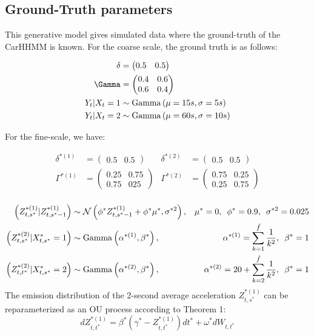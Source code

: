 \subsection{Ground-Truth parameters}

This generative model gives simulated data where the ground-truth of the CarHHMM is known. For the coarse scale, the ground truth is as follows:

\begin{align*}
    \delta &= \begin{pmatrix} 0.5 & 0.5 \end{pmatrix}\\
	\Gamma &= \begin{pmatrix} 0.4 & 0.6 \\ 0.6 & 0.4 \end{pmatrix} \\
	Y_t|X_t = 1 &\sim {\rm{Gamma}}\left(\mu = 15 s, \sigma = 5 s\right) \\
	Y_t|X_t = 2 &\sim {\rm{Gamma}}\left(\mu = 60 s, \sigma = 10 s\right) \\
\end{align*}

For the fine-scale, we have:

\begin{align*}
    \delta^{*(1)} &= \begin{pmatrix} 0.5 & 0.5 \end{pmatrix} & \delta^{*(2)} &= \begin{pmatrix} 0.5 & 0.5 \end{pmatrix} \\
    \Gamma^{*(1)} &= \begin{pmatrix} 0.25 & 0.75 \\ 0.75 & 025 \end{pmatrix} & 	\Gamma^{*(2)} &= \begin{pmatrix} 0.75 & 0.25 \\ 0.25 & 0.75 \end{pmatrix} \\
\end{align*}

\begin{align*}
    \left(Z^{*(1)}_{t,s^*} | Z^{*(1)}_{t,s^*-1} \right) &\sim \mathcal{N} \left(\phi^*Z^{*(1)}_{t,s^*-1} + \phi^*\mu^*, \sigma^{*2} \right), & \mu^* = 0, \enspace \phi^* = 0.9, \enspace \sigma^{*2} = 0.025 \\
    \left(Z^{*(2)}_{t,s^*} | X^*_{t,s^*} = 1\right) &\sim {\rm{Gamma}}\left(\alpha^{*(1)}, \beta^* \right), & \alpha^{*(1)} = \sum_{k=1}^{\tilde{f}} \frac{1}{k^2}, \enspace \beta^* = 1 \\
    \left(Z^{*(2)}_{t,t^*} | X^*_{t,s^*} = 2\right) &\sim {\rm{Gamma}}\left(\alpha^{*(2)}, \beta^* \right), & \alpha^{*(2)} = 20 + \sum_{k=2}^{\tilde{f}} \frac{1}{k^2}, \enspace \beta^* = 1 \\
\end{align*}
%
The emission distribution of the 2-second average acceleration $Z_{t,s^*}^{*(1)}$ can be reparameterized as an OU process according to Theorem 1:
%
$$dZ^{*(1)}_{t,t^*} = \beta^*(\gamma^* - Z^{*(1)}_{t,t^*})dt^* + \omega^* dW_{t,t^*}$$

